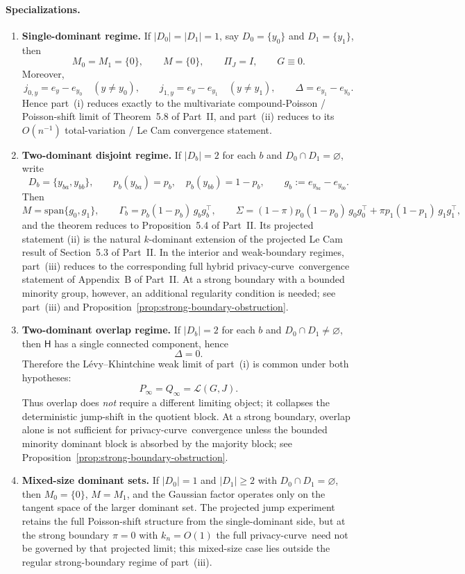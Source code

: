 \documentclass{article}
\newcommand{\1}{\mathbf 1}
\newcommand{\privacycurve}{\mbox{privacy-curve}}
\begin{document}
\paragraph{Specializations.}
\begin{enumerate}
\item[\textup{(a)}] \textbf{Single-dominant regime.}
If $|D_0|=|D_1|=1$, say $D_0=\{y_0\}$ and $D_1=\{y_1\}$, then
\[
M_0=M_1=\{0\},\qquad M=\{0\},\qquad \Pi_J=I,\qquad G\equiv 0.
\]
Moreover,
\[
j_{0,y}=e_y-e_{y_0}\quad (y\neq y_0),
\qquad
j_{1,y}=e_y-e_{y_1}\quad (y\neq y_1),
\qquad
\Delta=e_{y_1}-e_{y_0}.
\]
Hence part~\textup{(i)} reduces exactly to the multivariate compound-Poisson / Poisson-shift limit
of Theorem~5.8 of Part~II, and part~\textup{(ii)} reduces to its $O(n^{-1})$ total-variation / Le Cam
convergence statement.

\item[\textup{(b)}] \textbf{Two-dominant disjoint regime.}
If $|D_b|=2$ for each $b$ and $D_0\cap D_1=\varnothing$, write
\[
D_b=\{y_{ba},y_{bb}\},
\qquad
p_b(y_{ba})=p_b,\quad p_b(y_{bb})=1-p_b,
\qquad
g_b:=e_{y_{ba}}-e_{y_{bb}}.
\]
Then
\[
M=\mathrm{span}\{g_0,g_1\},
\qquad
\Gamma_b=p_b(1-p_b)\,g_bg_b^\top,
\qquad
\Sigma=(1-\pi)p_0(1-p_0)\,g_0g_0^\top+\pi p_1(1-p_1)\,g_1g_1^\top,
\]
and the theorem reduces to Proposition~5.4 of Part~II.
Its projected statement \textup{(ii)} is the natural $k$-dominant extension of the projected Le Cam
result of Section~5.3 of Part~II. In the interior and weak-boundary regimes, part~\textup{(iii)}
reduces to the corresponding full hybrid \privacycurve\ convergence statement of Appendix~B of Part~II.
At a strong boundary with a bounded minority group, however, an additional regularity condition is needed;
see part~\textup{(iii)} and Proposition~\ref{prop:strong-boundary-obstruction}.

\item[\textup{(c)}] \textbf{Two-dominant overlap regime.}
If $|D_b|=2$ for each $b$ and $D_0\cap D_1\neq\varnothing$, then $\mathsf H$ has a single connected
component, hence
\[
\Delta=0.
\]
Therefore the L\'evy--Khintchine weak limit of part~\textup{(i)} is common under both hypotheses:
\[
P_\infty=Q_\infty=\mathcal L(G,J).
\]
Thus overlap does \emph{not} require a different limiting object; it collapses the deterministic
jump-shift in the quotient block. At a strong boundary, overlap alone is not sufficient for
\privacycurve\ convergence unless the bounded minority dominant block is absorbed by the majority block;
see Proposition~\ref{prop:strong-boundary-obstruction}.

\item[\textup{(d)}] \textbf{Mixed-size dominant sets.}
If $|D_0|=1$ and $|D_1|\ge 2$ with $D_0\cap D_1=\varnothing$, then $M_0=\{0\}$,
$M=M_1$, and the Gaussian factor operates only on the tangent space of the larger
dominant set. The projected jump experiment retains the full Poisson-shift structure
from the single-dominant side, but at the strong boundary $\pi=0$ with $k_n=O(1)$ the full
\privacycurve\ need not be governed by that projected limit; this mixed-size case lies outside
the regular strong-boundary regime of part~\textup{(iii)}.
\end{enumerate}
\end{document}

